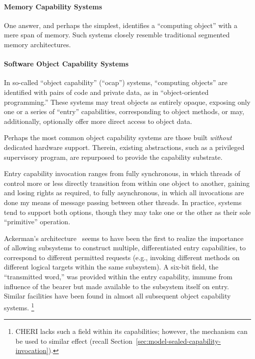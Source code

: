 \paragraph{Memory Capability Systems}

One answer, and perhaps the simplest, identifies a ``computing object'' with a
mere span of memory.  Such systems closely resemble traditional segmented memory
architectures.


\paragraph{Software Object Capability Systems}

In so-called ``object capability'' (``ocap'') systems, ``computing objects''
are identified with pairs of code and private data, as in ``object-oriented
programming.''  These systems may treat objects as entirely opaque, exposing
only one or a series of ``entry'' capabilities, corresponding to object
methods, or may, additionally, optionally offer more direct access to object
data.

Perhaps the most common object capability systems are those built
\emph{without} dedicated hardware support.  Therein, existing abstractions,
such as a privileged supervisory program, are repurposed to provide the
capability substrate.

Entry capability invocation ranges from fully synchronous, in which threads of
control more or less directly transition from within one object to another,
gaining and losing rights as required, to fully asynchronous, in which all
invocations are done my means of message passing between other threads.  In
practice, systems tend to support both options, though they may take one or the
other as their sole ``primitive'' operation.

Ackerman's architecture~\cite{ackerman:multiprocessing} seems to have been
the first to realize the importance of allowing subsystems to construct
multiple, differentiated entry capabilities, to correspond to different
permitted requests (e.g., invoking different methods on different logical
targets within the same subsystem).  A six-bit field, the ``transmitted
word,'' was provided within the entry capability, immune from influence of
the bearer but made available to the subsystem itself on entry.  Similar
facilities have been found in almost all subsequent object capability
systems.%
%
\footnote{CHERI lacks such a field within its capabilities; however, the
 mechanism can be used to similar effect (recall
Section~\ref{sec:model-sealed-capability-invocation}).}

